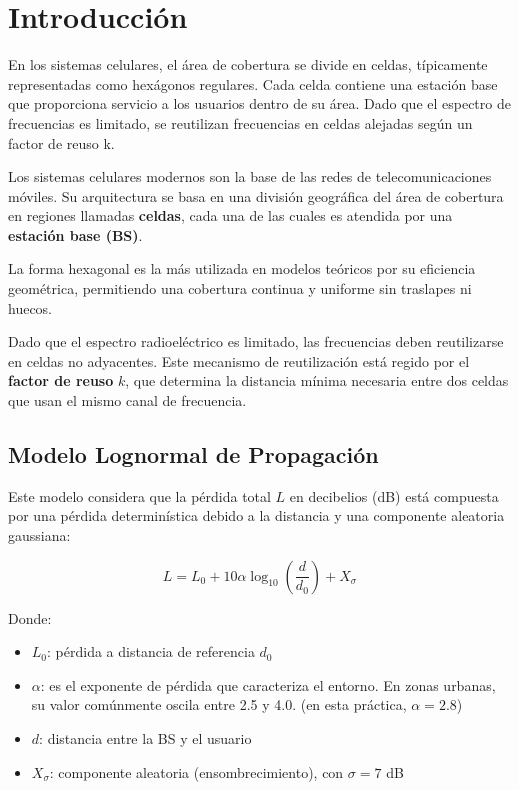 \section{\Large Introducción}
En los sistemas celulares, el área de cobertura se divide en celdas, típicamente representadas como hexágonos regulares. Cada celda contiene una estación base que proporciona servicio a los usuarios dentro de su área. Dado que el espectro de frecuencias es limitado, se reutilizan frecuencias en celdas alejadas según un factor de reuso k.

Los sistemas celulares modernos son la base de las redes de telecomunicaciones móviles. Su arquitectura se basa en una división geográfica del área de cobertura en regiones llamadas \textbf{celdas}, cada una de las cuales es atendida por una \textbf{estación base (BS)}.

La forma hexagonal es la más utilizada en modelos teóricos por su eficiencia geométrica, permitiendo una cobertura continua y uniforme sin traslapes ni huecos.

Dado que el espectro radioeléctrico es limitado, las frecuencias deben reutilizarse en celdas no adyacentes. Este mecanismo de reutilización está regido por el \textbf{factor de reuso} \( k \), que determina la distancia mínima necesaria entre dos celdas que usan el mismo canal de frecuencia.

\subsection*{Modelo Lognormal de Propagación}

Este modelo considera que la pérdida total \( L \) en decibelios (dB) está compuesta por una pérdida determinística debido a la distancia y una componente aleatoria gaussiana:

\[
L = L_0 + 10 \alpha \log_{10} \left( \frac{d}{d_0} \right) + X_\sigma
\]

Donde:
\begin{itemize}
    \item \( L_0 \): pérdida a distancia de referencia \( d_0 \)
    \item \( \alpha \): es el exponente de pérdida que caracteriza el entorno. En zonas urbanas, su valor comúnmente oscila entre 2.5 y 4.0. (en esta práctica, \( \alpha = 2.8 \))
    \item \( d \): distancia entre la BS y el usuario
    \item \( X_\sigma \): componente aleatoria (ensombrecimiento), con \( \sigma = 7 \) dB
\end{itemize}

